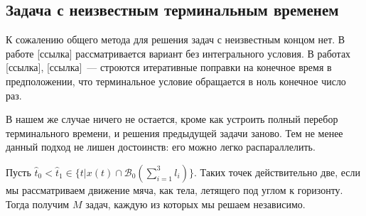 \subsection{Задача с неизвестным терминальным временем}

К сожалению общего метода для решения задач с неизвестным концом нет.
В работе [ссылка] рассматривается вариант без интегрального условия.
В работах [ссылка], [ссылка]~--- строются итеративные поправки на конечное время в предположении, что терминальное условие обращается в ноль конечное число раз.

В нашем же случае ничего не остается, кроме как устроить полный перебор терминального времени, и решения предыдущей задачи заново.
Тем не менее данный подход не лишен достоинств: его можно легко распараллелить.

Пусть $\hat t_0 < \hat t_1 \in \{t | x(t) \cap \mathcal{B}_0(\sum_{i=1}^{3}l_i) \}$.
Таких точек действительно две, если мы рассматриваем движение мяча, как тела, летящего под углом к горизонту.
Тогда получим $M$ задач, каждую из которых мы решаем независимо.
